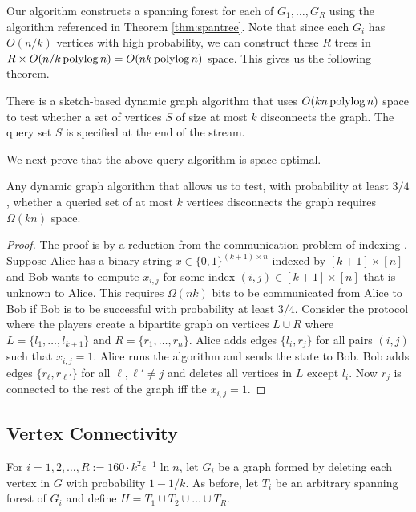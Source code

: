 Our algorithm constructs a spanning forest for each of $G_1, \ldots, G_R$ using the algorithm referenced in Theorem \ref{thm:spantree}. Note that since each $G_i$ has $O(n/k)$ vertices with high probability, we can construct these $R$ trees in $R\times O(n/k \operatorname{polylog} n)=O(nk\operatorname{polylog} n)$ space. This gives us the following theorem.

\begin{theorem}
There is a sketch-based dynamic graph algorithm that uses $O(kn \operatorname{polylog} n)$ space to test whether a set of vertices $S$ of size at most $k$ disconnects the graph. The query set $S$ is specified at the end of the stream.
\end{theorem}

We next prove that the above query algorithm is space-optimal.

\begin{theorem}
Any dynamic graph algorithm that allows us to test, with probability at least $3/4$, whether a queried set of at most $k$ vertices disconnects the graph requires $\Omega(kn)$ space.
\end{theorem}
\begin{proof}
The proof is by a reduction from the communication problem of indexing \cite{Ablayev96}. Suppose Alice has a binary string $x\in \{0,1\}^{(k+1)\times n}$ indexed by $[k+1]\times [n]$ and Bob wants to compute $x_{i,j}$ for some  index $(i,j)\in [k+1]\times [n]$ that is unknown to Alice. This requires $\Omega(nk)$ bits to be communicated from Alice to Bob if Bob is to be successful with probability at least $3/4$. Consider the protocol where the players create a bipartite graph on vertices $L\cup R$ where $L=\{l_1, \ldots, l_{k+1}\}$ and $R=\{r_1, \ldots, r_n\}$. Alice adds edges $\{l_i,r_j\}$ for all pairs $(i,j)$ such that $x_{i,j}=1$. 
Alice runs the algorithm and sends the state to Bob. Bob adds edges $\{r_\ell,r_{\ell'}\}$ for all $\ell,\ell'\neq j$ and deletes all vertices in $L$ except $l_i$. Now $r_j$ is connected to the rest of the graph iff the $x_{i,j}=1$.
\end{proof}


\subsection{Vertex Connectivity}

For $i=1,2,\ldots, R:=160\cdot k^2 \epsilon^{-1}  \ln n$, let $G_i$ be a graph formed by deleting each vertex in $G$ with probability $1-1/k$. As before, let $T_i$ be an arbitrary spanning forest of $G_i$ and define $H=T_1\cup T_2 \cup \ldots \cup T_R$.

